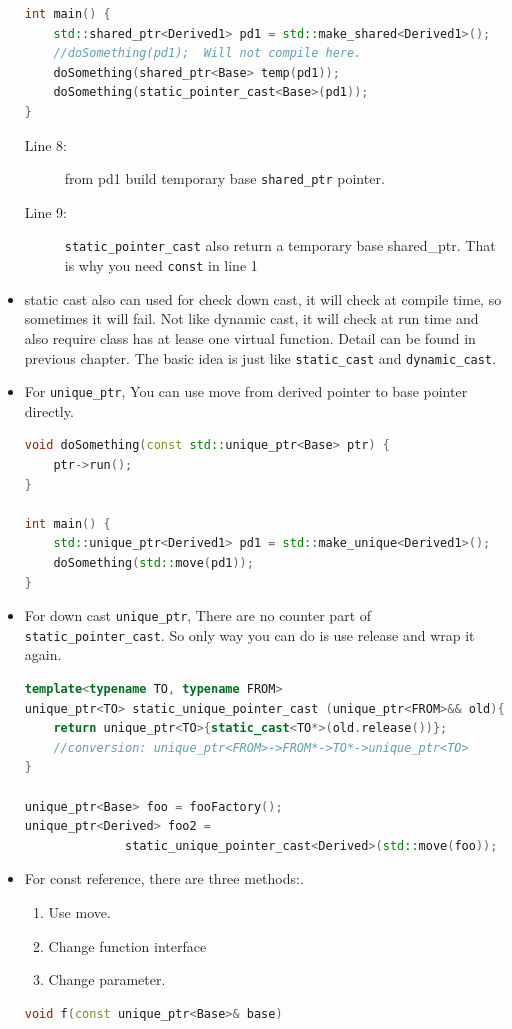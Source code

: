 \documentclass[a4paper,11pt,twoside]{book}
\begin{document}
\begin{itemize}
\begin{lstlisting}[frame=single, language=c++, mathescape=true]
int main() {
	std::shared_ptr<Derived1> pd1 = std::make_shared<Derived1>();
	//doSomething(pd1);  Will not compile here.
	doSomething(shared_ptr<Base> temp(pd1));
	doSomething(static_pointer_cast<Base>(pd1));
}
\end{lstlisting}
	\begin{description}
	\item[Line 8:] from pd1 build temporary base \texttt{shared\_ptr} pointer.
	\item[Line 9:] \texttt{static\_pointer\_cast} also return a temporary base shared\_ptr. That is why you need \texttt{const} in line 1
\end{description}


\item static cast also can used for check down cast, it will check at compile time, so sometimes it will fail. Not like dynamic cast, it will check at run time and also require class has at lease one virtual function. Detail can be found in previous chapter. The basic idea is just like \texttt{static\_cast} and \texttt{dynamic\_cast}.

\item For \texttt{unique\_ptr}, You can use move from derived pointer to base pointer directly.
\begin{lstlisting}[frame=single, language=c++, mathescape=true]
void doSomething(const std::unique_ptr<Base> ptr) {
    ptr->run();
}

int main() {
    std::unique_ptr<Derived1> pd1 = std::make_unique<Derived1>();
    doSomething(std::move(pd1));
}
\end{lstlisting}

\item For down cast \texttt{unique\_ptr}, There are no counter part of \texttt{static\_pointer\_cast}. So only way you can do is use release and wrap it again.

\begin{lstlisting}[frame=single, language=c++, mathescape=true]
template<typename TO, typename FROM>
unique_ptr<TO> static_unique_pointer_cast (unique_ptr<FROM>&& old){
	return unique_ptr<TO>{static_cast<TO*>(old.release())};
	//conversion: unique_ptr<FROM>->FROM*->TO*->unique_ptr<TO>
}

unique_ptr<Base> foo = fooFactory();
unique_ptr<Derived> foo2 = 
              static_unique_pointer_cast<Derived>(std::move(foo));
\end{lstlisting}

\item For const reference, there are three methods:.
		\begin{enumerate}
				\item Use move.
				\item Change function interface
				\item Change parameter.
		\end{enumerate}
\begin{lstlisting}[frame=single, language=c++, mathescape=true]
void f(const unique_ptr<Base>& base)


\end{lstlisting}
\end{itemize}
\end{document}
